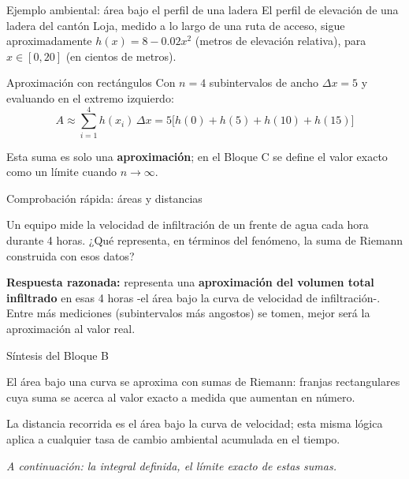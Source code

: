 \documentclass[aspectratio=169,11pt]{beamer}
\begin{document}
\begin{frame}{Ejemplo ambiental: área bajo el perfil de una ladera}
\small
El perfil de elevación de una ladera del cantón Loja, medido a lo largo de una ruta de acceso, sigue aproximadamente $h(x) = 8 - 0.02x^2$ (metros de elevación relativa), para $x\in[0,20]$ (en cientos de metros).
\vspace{0.1cm}
\begin{block}{Aproximación con rectángulos}
Con $n=4$ subintervalos de ancho $\Delta x = 5$ y evaluando en el extremo izquierdo:
\[
A \approx \sum_{i=1}^{4} h(x_i)\,\Delta x = 5\big[h(0)+h(5)+h(10)+h(15)\big]
\]
\end{block}
\begin{keybox}
Esta suma es solo una \textbf{aproximación}; en el Bloque C se define el valor exacto como un límite cuando $n\to\infty$.
\end{keybox}
\end{frame}

\begin{frame}{Comprobación rápida: áreas y distancias}
\begin{checkbox}
Un equipo mide la velocidad de infiltración de un frente de agua cada hora durante 4 horas. ¿Qué representa, en términos del fenómeno, la suma de Riemann construida con esos datos?
\end{checkbox}
\vspace{0.2cm}
\begin{keybox}
\textbf{Respuesta razonada:} representa una \textbf{aproximación del volumen total infiltrado} en esas 4 horas -el área bajo la curva de velocidad de infiltración-. Entre más mediciones (subintervalos más angostos) se tomen, mejor será la aproximación al valor real.
\end{keybox}
\end{frame}

\begin{frame}{Síntesis del Bloque B}
\begin{keybox}
El área bajo una curva se aproxima con sumas de Riemann: franjas rectangulares cuya suma se acerca al valor exacto a medida que aumentan en número.
\end{keybox}
\begin{keybox}
La distancia recorrida es el área bajo la curva de velocidad; esta misma lógica aplica a cualquier tasa de cambio ambiental acumulada en el tiempo.
\end{keybox}
\vspace{0.1cm}
\textit{A continuación: la integral definida, el límite exacto de estas sumas.}
\end{frame}
\end{document}
